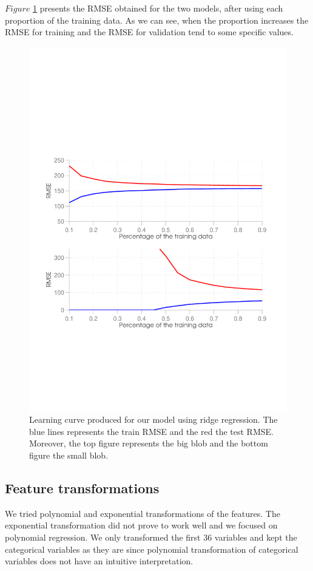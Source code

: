 $Figure$ \ref{fig:learning_curve} presents the RMSE obtained for the two models, after using each proportion of the training data. As we can see, when the proportion increases the RMSE for training and the RMSE for validation tend to some specific values.

\begin{figure}[ht]
  \centering
   \includegraphics[scale=0.3]{figures/learning_curve.pdf}
  \caption{Learning curve produced for our model using ridge regression. The blue lines represents the train RMSE and the red the test RMSE. Moreover, the top figure represents the big blob and the bottom figure the small blob.}
  \label{fig:learning_curve}
\end{figure}

\subsection{Feature transformations}
We tried polynomial and exponential transformations of the features.
The exponential transformation did not prove to work well and we focused on polynomial regression.
We only transformed the first 36 variables and kept the categorical variables as they are since polynomial transformation of categorical variables does not have an intuitive interpretation. 

